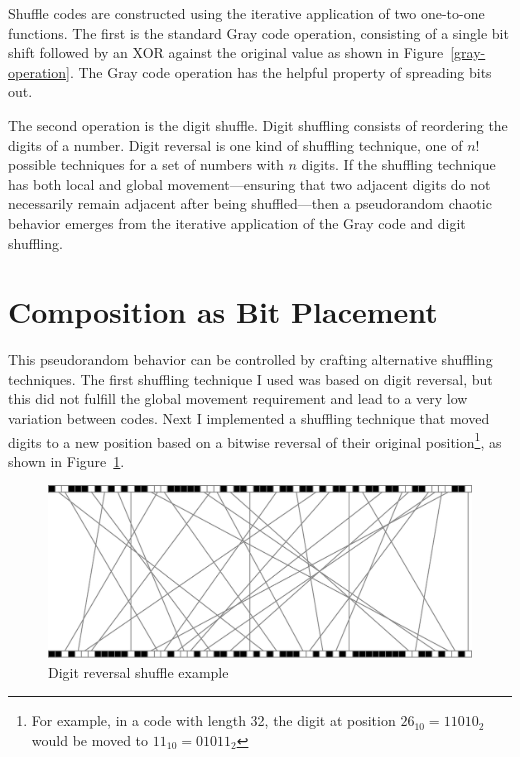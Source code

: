 \documentclass{thesis}
\begin{document}
Shuffle codes are constructed using the iterative application of two one-to-one functions. The first is the standard Gray code operation, consisting of a single bit shift followed by an XOR against the original value as shown in Figure~\ref{gray-operation}. The Gray code operation has the helpful property of spreading bits out.

The second operation is the digit shuffle. Digit shuffling consists of reordering the digits of a number. Digit reversal is one kind of shuffling technique, one of $n!$ possible techniques for a set of numbers with $n$ digits. If the shuffling technique has both local and global movement---ensuring that two adjacent digits do not necessarily remain adjacent after being shuffled---then a pseudorandom chaotic behavior emerges from the iterative application of the Gray code and digit shuffling.

\section{Composition as Bit Placement}

This pseudorandom behavior can be controlled by crafting alternative shuffling techniques. The first shuffling technique I used was based on digit reversal, but this did not fulfill the global movement requirement and lead to a very low variation between codes. Next I implemented a shuffling technique that moved digits to a new position based on a bitwise reversal of their original position\footnote{For example, in a code with length 32, the digit at position $26_{10}=11010_2$ would be moved to $11_{10}=01011_2$}, as shown in Figure~\ref{reversal-shuffle}.

\begin{figure}
	\begin{center}
		\includegraphics[scale=.5]{graphics/reversal-shuffle.pdf}
		\caption{Digit reversal shuffle example}
		\label{reversal-shuffle}
	\end{center}
\end{figure}
\end{document}
